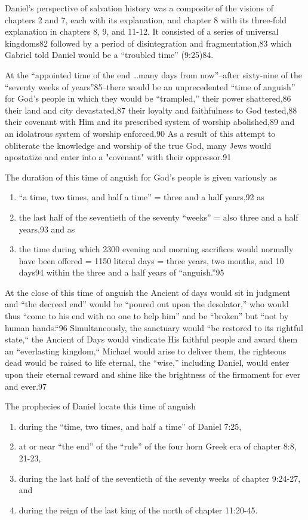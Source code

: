 Daniel's perspective of salvation history was a composite of the visions of
chapters 2 and 7, each with its explanation, and chapter 8 with
its three-fold explanation in chapters 8, 9, and 11-12. It consisted of a 
series of universal kingdoms82 followed by a period of disintegration and
fragmentation,83 which Gabriel told Daniel would be a ``troubled time''
(9:25)84.

At the ``appointed time of the end \ldots many days from now''--after sixty-nine
of the ``seventy weeks of years''85--there would be an unprecedented ``time of
anguish'' for God's people in which they would be ``trampled,'' their power
shattered,86 their land and city devastated,87 their loyalty and
faithfulness to God tested,88 their covenant with Him and its prescribed
system of worship abolished,89 and an idolatrous system of worship
enforced.90 As a result of this attempt to obliterate the knowledge and
worship of the true God, many Jews would apostatize and enter into a
"covenant" with their oppressor.91

The duration of this time of anguish for God's people is given variously as
\begin{enumerate}
    \item ``a time, two times, and half a time'' = three and a half years,92 as
    \item the last half of the seventieth of the seventy ``weeks'' = also three and a
half years,93 and as 
    \item  the time during which 2300 evening and morning
sacrifices would normally have been offered = 1150 literal days = three
years, two months, and 10 days94 within the three and a half years of
``anguish.''95 
\end{enumerate}

At the close of this time of anguish the Ancient of days would sit in
judgment and ``the decreed end'' would be ``poured out upon the desolator,'' who
would thus ``come to his end with no one to help him'' and be ``broken'' but
``not by human hands.``96 Simultaneously, the sanctuary would ``be restored to
its rightful state,`` the Ancient of Days would vindicate His faithful people
and award them an ``everlasting kingdom,`` Michael would arise to deliver
them, the righteous dead would be raised to life eternal, the ``wise,''
including Daniel, would enter upon their eternal reward and shine like the
brightness of the firmament for ever and ever.97

The prophecies of Daniel locate this time of anguish 
\begin{enumerate}
    \item during the ``time,
two times, and half a time'' of Daniel 7:25, 
    \item at or near ``the end'' of the
``rule'' of the four horn Greek era of chapter 8:8, 21-23, 
    \item during the last
half of the seventieth of the seventy weeks of chapter 9:24-27, and 
    \item during the reign of the last king of the north of chapter 11:20-45. 
\end{enumerate}

